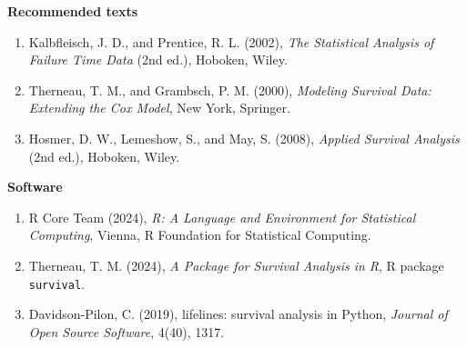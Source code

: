 \documentclass[11pt,a4paper]{article}
\numberwithin{equation}{section}
\theoremstyle{definition}
\newcommand{\subhead}[1]{%
  \par\medskip\noindent\textbf{#1}\par\nobreak\smallskip}
\begin{document}
\subhead{Recommended texts}
\begin{enumerate}
\item Kalbfleisch, J. D., and Prentice, R. L. (2002), \emph{The Statistical Analysis of Failure Time Data} (2nd ed.), Hoboken, Wiley.
\item Therneau, T. M., and Grambsch, P. M. (2000), \emph{Modeling Survival Data: Extending the Cox Model}, New York, Springer.
\item Hosmer, D. W., Lemeshow, S., and May, S. (2008), \emph{Applied Survival Analysis} (2nd ed.), Hoboken, Wiley.
\end{enumerate}

\subhead{Software}
\begin{enumerate}
\item R Core Team (2024), \emph{R: A Language and Environment for Statistical Computing}, Vienna, R Foundation for Statistical Computing.
\item Therneau, T. M. (2024), \emph{A Package for Survival Analysis in R}, R package \texttt{survival}.
\item Davidson-Pilon, C. (2019), lifelines: survival analysis in Python, \emph{Journal of Open Source Software}, 4(40), 1317.
\end{enumerate}
\end{document}
